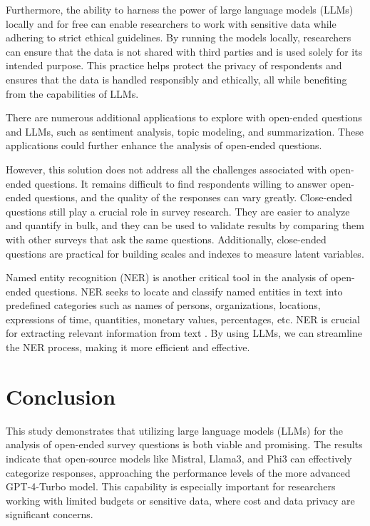 \documentclass[
  authoryear,
  preprint,
  3p]{elsarticle}
\begin{document}
Furthermore, the ability to harness the power of large language models
(LLMs) locally and for free can enable researchers to work with
sensitive data while adhering to strict ethical guidelines. By running
the models locally, researchers can ensure that the data is not shared
with third parties and is used solely for its intended purpose. This
practice helps protect the privacy of respondents and ensures that the
data is handled responsibly and ethically, all while benefiting from the
capabilities of LLMs.

There are numerous additional applications to explore with open-ended
questions and LLMs, such as sentiment analysis, topic modeling, and
summarization. These applications could further enhance the analysis of
open-ended questions.

However, this solution does not address all the challenges associated
with open-ended questions. It remains difficult to find respondents
willing to answer open-ended questions, and the quality of the responses
can vary greatly. Close-ended questions still play a crucial role in
survey research. They are easier to analyze and quantify in bulk, and
they can be used to validate results by comparing them with other
surveys that ask the same questions. Additionally, close-ended questions
are practical for building scales and indexes to measure latent
variables.

Named entity recognition (NER) is another critical tool in the analysis
of open-ended questions. NER seeks to locate and classify named entities
in text into predefined categories such as names of persons,
organizations, locations, expressions of time, quantities, monetary
values, percentages, etc. NER is crucial for extracting relevant
information from text \citep{yadav_bethard19}. By using LLMs, we can
streamline the NER process, making it more efficient and effective.

\section{Conclusion}\label{conclusion}

This study demonstrates that utilizing large language models (LLMs) for
the analysis of open-ended survey questions is both viable and
promising. The results indicate that open-source models like Mistral,
Llama3, and Phi3 can effectively categorize responses, approaching the
performance levels of the more advanced GPT-4-Turbo model. This
capability is especially important for researchers working with limited
budgets or sensitive data, where cost and data privacy are significant
concerns.
\end{document}
